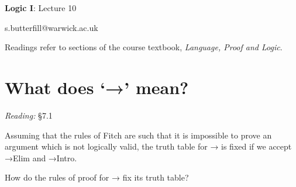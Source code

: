 \documentclass[12pt]{extarticle}
\date{}
\makeatletter
\def \ititle {Origins of Mind}
\def \isubtitle {Lecture 08}
\def \iemail{s.butterfill@warwick.ac.uk}
\makeatother
\begin{document}

\begin{multicols*}{3}

\setlength\footnotesep{1em}









\def \ititle {Logic I}
 
\def \isubtitle {Lecture 10}
 
\begin{center}
 
{\Large
 
\textbf{\ititle}: \isubtitle
 
}
 
 
 
\iemail %
 
\end{center}
 
Readings refer to sections of the course textbook, \emph{Language, Proof and Logic}.
 
 
 
\section{What does ‘→’ mean?}
 
\emph{Reading:} §7.1
 
Assuming that the rules of Fitch are such that it is impossible to prove an argument which is not logically valid, the truth table for → is fixed if we accept →Elim and →Intro.
 
How do the rules of proof for → fix its truth table?
 

\end{multicols*}
\end{document}
